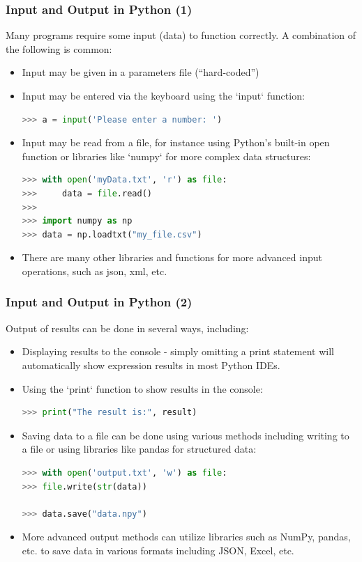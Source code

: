 \begin{frame}[fragile]
  \frametitle{Input and Output in Python (1)}
  Many programs require some input (data) to function correctly. A combination of the following is common:
  \begin{itemize}[<+->]
    \item Input may be given in a parameters file (``hard-coded'')
    \item Input may be entered via the keyboard using the `input` function:
    \begin{lstlisting}[language=Python,numbers=none]
>>> a = input('Please enter a number: ')
    \end{lstlisting}
    \item Input may be read from a file, for instance using Python's built-in open function or libraries like `numpy` for more complex data structures:
    \begin{lstlisting}[language=Python,numbers=none]
>>> with open('myData.txt', 'r') as file:
>>>     data = file.read()
>>> 
>>> import numpy as np
>>> data = np.loadtxt("my_file.csv")
    \end{lstlisting}
    \item There are many other libraries and functions for more advanced input operations, such as json, xml, etc.
  \end{itemize}
 \end{frame}

 \begin{frame}[fragile]
  \frametitle{Input and Output in Python (2)}
  Output of results can be done in several ways, including:
  \begin{itemize}[<+->]
    \item Displaying results to the console - simply omitting a print statement will automatically show expression results in most Python IDEs.
    \item Using the `print` function to show results in the console:
    \begin{lstlisting}[language=Python,numbers=none]
>>> print("The result is:", result)
    \end{lstlisting}
    \item Saving data to a file can be done using various methods including writing to a file or using libraries like pandas for structured data:
    \begin{lstlisting}[language=Python,numbers=none]
>>> with open('output.txt', 'w') as file:
>>> file.write(str(data))

>>> data.save("data.npy")
    \end{lstlisting}
    \item More advanced output methods can utilize libraries such as NumPy, pandas, etc. to save data in various formats including JSON, Excel, etc.
  \end{itemize}
 \end{frame}



